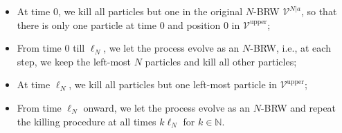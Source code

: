\begin{itemize}
    \item At time $0$, we kill all particles but one in the original $N$-BRW $\mathcal V^{N|a}$, so that there is only one particle at time $0$ and position $0$ in $\mathcal V^{\mathrm{upper}}$;
    \item From time $0$ till $\ell_N$, we let the process evolve as an $N$-BRW, i.e., at each step, we keep the left-most $N$ particles and kill all other particles;
    \item At time $\ell_N$, we kill all particles but one left-most particle in $\mathcal V^{\mathrm{upper}}$;
    \item From time $\ell_N$ onward, we let the process evolve as an $N$-BRW and repeat the killing procedure at all times $k\ell_N$ for $k\in\mathbb N$.
\end{itemize}
